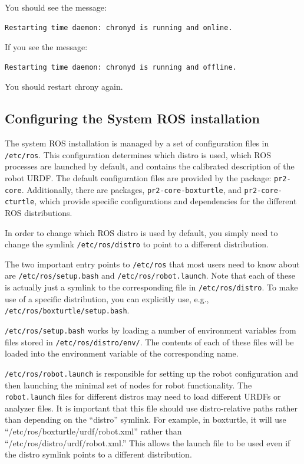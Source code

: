 You should see the message:
\begin{verbatim}
Restarting time daemon: chronyd is running and online.
\end{verbatim}

If you see the message:
\begin{verbatim}
Restarting time daemon: chronyd is running and offline.
\end{verbatim}

You should restart chrony again.

\subsection{Configuring the System ROS installation}
The system ROS installation is managed by a set of configuration files
in \texttt{/etc/ros}.  This configuration determines which distro is used,
which ROS processes are launched by default, and contains the
calibrated description of the robot URDF.  The default configuration
files are provided by the package: \texttt{pr2-core}.  Additionally, there
are packages, \texttt{pr2-core-boxturtle}, and \texttt{pr2-core-cturtle}, which
provide specific configurations and dependencies for the different ROS distributions.

In order to change which ROS distro is used by default, you simply
need to change the symlink \texttt{/etc/ros/distro} to point to a
different distribution.

The two important entry points to \texttt{/etc/ros} that most users
need to know about are \texttt{/etc/ros/setup.bash} and
\texttt{/etc/ros/robot.launch}.  Note that each of these is actually
just a symlink to the corresponding file in \texttt{/etc/ros/distro}.
To make use of a specific distribution, you can explicitly use, e.g.,
\texttt{/etc/ros/boxturtle/setup.bash}.

\texttt{/etc/ros/setup.bash} works by loading a number of environment
variables from files stored in \texttt{/etc/ros/distro/env/}.  The
contents of each of these files will be loaded into the environment
variable of the corresponding name.

\texttt{/etc/ros/robot.launch} is responsible for setting up the robot
configuration and then launching the minimal set of nodes for robot
functionality.  The \texttt{robot.launch} files for different distros
may need to load different URDFs or analyzer files.  It is important
that this file should use distro-relative paths rather than depending
on the ``distro'' symlink.  For example, in boxturtle, it will use
``/etc/ros/boxturtle/urdf/robot.xml'' rather than
``/etc/ros/distro/urdf/robot.xml.''  This allows the launch file to be
used even if the distro symlink points to a different distribution.

